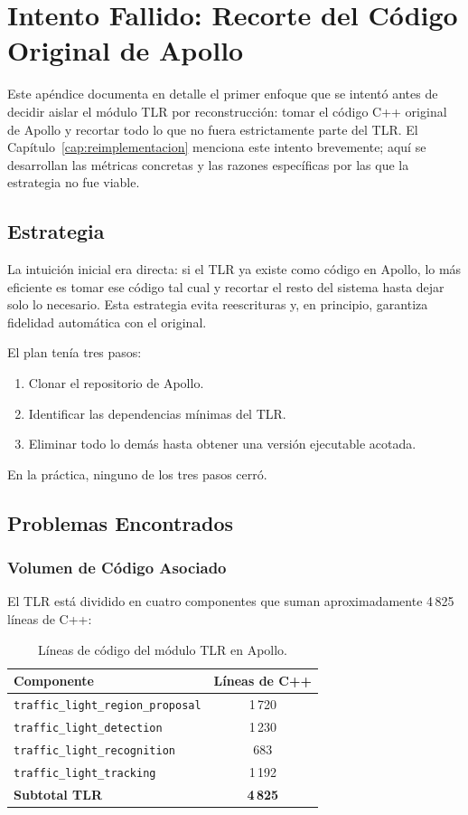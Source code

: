 \chapter{Intento Fallido: Recorte del Código Original de Apollo}
\label{apendice:recorte_fallido}

Este apéndice documenta en detalle el primer enfoque que se intentó antes de decidir aislar el módulo TLR por reconstrucción: tomar el código C++ original de Apollo y recortar todo lo que no fuera estrictamente parte del TLR. El Capítulo~\ref{cap:reimplementacion} menciona este intento brevemente; aquí se desarrollan las métricas concretas y las razones específicas por las que la estrategia no fue viable.

\section{Estrategia}

La intuición inicial era directa: si el TLR ya existe como código en Apollo, lo más eficiente es tomar ese código tal cual y recortar el resto del sistema hasta dejar solo lo necesario. Esta estrategia evita reescrituras y, en principio, garantiza fidelidad automática con el original.

El plan tenía tres pasos:

\begin{enumerate}
    \item Clonar el repositorio de Apollo.
    \item Identificar las dependencias mínimas del TLR.
    \item Eliminar todo lo demás hasta obtener una versión ejecutable acotada.
\end{enumerate}

En la práctica, ninguno de los tres pasos cerró.

\section{Problemas Encontrados}

\subsection{Volumen de Código Asociado}

El TLR está dividido en cuatro componentes que suman aproximadamente 4\,825 líneas de C++:

\begin{table}[H]
\centering
\begin{tabular}{|l|c|}
\hline
\textbf{Componente} & \textbf{Líneas de C++} \\
\hline
\texttt{traffic\_light\_region\_proposal} & 1\,720 \\
\texttt{traffic\_light\_detection} & 1\,230 \\
\texttt{traffic\_light\_recognition} & 683 \\
\texttt{traffic\_light\_tracking} & 1\,192 \\
\hline
\textbf{Subtotal TLR} & \textbf{4\,825} \\
\hline
\end{tabular}
\caption{Líneas de código del módulo TLR en Apollo.}
\end{table}

